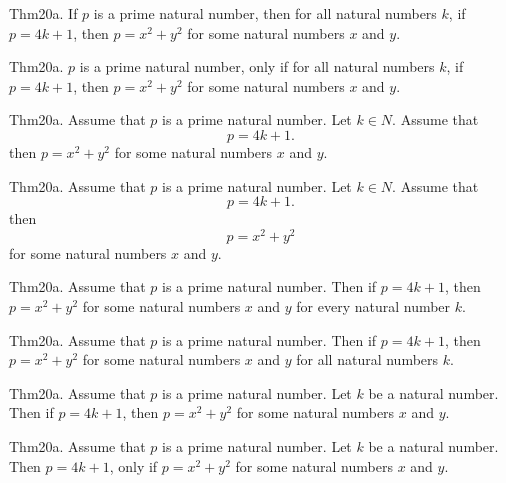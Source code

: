 \documentclass{article}
\begin{document}
Thm20a. If $p$ is a prime natural number, then for all natural numbers $k$, if $p = 4 k + 1$, then $p = x ^{ 2}+ y ^{ 2}$ for some natural numbers $x$ and $y$.

Thm20a. $p$ is a prime natural number, only if for all natural numbers $k$, if $p = 4 k + 1$, then $p = x ^{ 2}+ y ^{ 2}$ for some natural numbers $x$ and $y$.

Thm20a. Assume that $p$ is a prime natural number. Let $k \in N$. Assume that $$p = 4 k + 1.$$ then $p = x ^{ 2}+ y ^{ 2}$ for some natural numbers $x$ and $y$.

Thm20a. Assume that $p$ is a prime natural number. Let $k \in N$. Assume that $$p = 4 k + 1.$$ then $$p = x ^{ 2}+ y ^{ 2}$$ for some natural numbers $x$ and $y$.

Thm20a. Assume that $p$ is a prime natural number. Then if $p = 4 k + 1$, then $p = x ^{ 2}+ y ^{ 2}$ for some natural numbers $x$ and $y$ for every natural number $k$.

Thm20a. Assume that $p$ is a prime natural number. Then if $p = 4 k + 1$, then $p = x ^{ 2}+ y ^{ 2}$ for some natural numbers $x$ and $y$ for all natural numbers $k$.

Thm20a. Assume that $p$ is a prime natural number. Let $k$ be a natural number. Then if $p = 4 k + 1$, then $p = x ^{ 2}+ y ^{ 2}$ for some natural numbers $x$ and $y$.

Thm20a. Assume that $p$ is a prime natural number. Let $k$ be a natural number. Then $p = 4 k + 1$, only if $p = x ^{ 2}+ y ^{ 2}$ for some natural numbers $x$ and $y$.
\end{document}
